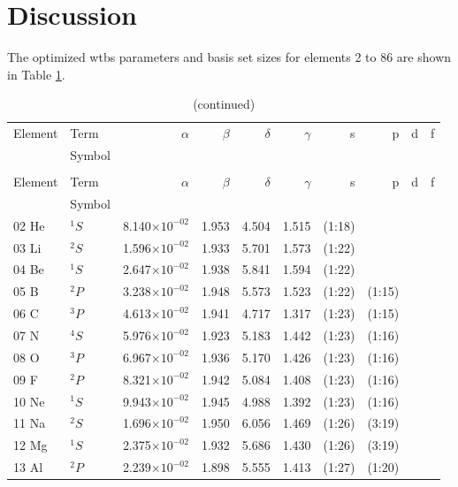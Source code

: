 \documentclass[12pt]{report}
\newcommand{\notetodylan}[1]{\textcolor{red}{#1}} %
\begin{document}
\section{Discussion}

The optimized wtbs parameters and basis set sizes for elements 2 to 86 are shown in Table \ref{tab:BStab}.

\begin{longtable}{l l r r r r r r r r}
\caption[Basis sets optimized using rwtbs]{Basis sets optimized using rwtbs \notetodylan{make these a multirow}}\label{tab:BStab} \\
\toprule
	Element	&	Term		&	$\alpha$	&	$\beta$	&	$\delta$	&	$\gamma$	&	s	&	p	&	d	&	f	\\
			&	Symbol	&			&			&			&				&		&		&		&		\\
\midrule
\endfirsthead
\caption[]{(continued)}\\
\toprule
	Element	&	Term		&	$\alpha$	&	$\beta$	&	$\delta$	&	$\gamma$	&	s	&	p	&	d	&	f	\\
			&	Symbol	&			&			&			&				&		&		&		&		\\
\midrule
\endhead
02 He & $^{1}S$ & 8.140$\times10^{-02}$ & 1.953 & 4.504 & 1.515 & (1:18) \\
03 Li & $^{2}S$ & 1.596$\times10^{-02}$ & 1.933 & 5.701 & 1.573 & (1:22)  \\
04 Be & $^{1}S$ & 2.647$\times10^{-02}$ & 1.938 & 5.841 & 1.594 & (1:22) \\	
05 B & $^{2}P$ & 3.238$\times10^{-02}$ & 1.948 & 5.573 & 1.523 & (1:22) & (1:15) \\
06 C & $^{3}P$ & 4.613$\times10^{-02}$ & 1.941 & 4.717 & 1.317 & (1:23) & (1:15) \\
07 N & $^{4}S$ & 5.976$\times10^{-02}$ & 1.923 & 5.183 & 1.442 & (1:23) & (1:16)  \\
08 O & $^{3}P$ & 6.967$\times10^{-02}$ & 1.936 & 5.170 & 1.426 & (1:23) & (1:16) \\
09 F & $^{2}P$ & 8.321$\times10^{-02}$ & 1.942 & 5.084 & 1.408 & (1:23) & (1:16) \\
10 Ne & $^{1}S$ & 9.943$\times10^{-02}$ & 1.945 & 4.988 & 1.392 & (1:23) & (1:16) \\
11 Na & $^{2}S$ & 1.696$\times10^{-02}$ & 1.950 & 6.056 & 1.469 & (1:26) & (3:19)  \\
12 Mg & $^{1}S$ & 2.375$\times10^{-02}$ & 1.932 & 5.686 & 1.430 & (1:26) & (3:19) \\
13 Al & $^{2}P$ & 2.239$\times10^{-02}$ & 1.898 & 5.555 & 1.413 & (1:27) & (1:20)  \\

\end{longtable}
\end{document}

